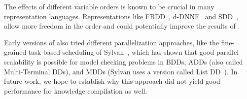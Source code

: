 The effects of different variable orders is known to be crucial in many representation languages. Representations like FBDD~\cite{wegener2000branching}, d-DNNF~\cite{chavira2006compiling} and SDD~\cite{darwiche2011sdd}, allow more freedom in the order and could potentially improve the results of \toolname.

Early versions of \toolname also tried different parallelization approaches, like the fine-grained task-based scheduling of Sylvan~\cite{van2013multi}, which has shown that good parallel scalability is possible for model checking problems in BDDs, ADDs (also called Multi-Terminal DDs), and MDDs (Sylvan uses a version called List DD~\cite{sylvan-journal}). In future work, we hope to establish why this approach did not yield good performance for knowledge compilation as well.




